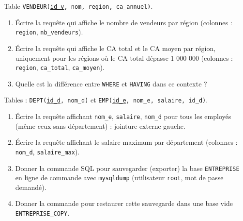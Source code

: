 \documentclass[11pt]{article}
\begin{document}
\begin{exercice}
Table \texttt{VENDEUR(\underline{id\_v}, nom, region, ca\_annuel)}.
\begin{enumerate}
    \item Écrire la requête qui affiche le nombre de vendeurs par région (colonnes : \texttt{region}, \texttt{nb\_vendeurs}).
    \item Écrire la requête qui affiche le CA total et le CA moyen par région, uniquement pour les régions où le CA total dépasse 1 000 000 (colonnes : \texttt{region}, \texttt{ca\_total}, \texttt{ca\_moyen}).
    \item Quelle est la différence entre \texttt{WHERE} et \texttt{HAVING} dans ce contexte ?
\end{enumerate}
\end{exercice}

\begin{exercice}
Tables : \texttt{DEPT(\underline{id\_d}, nom\_d)} et \texttt{EMP(\underline{id\_e}, nom\_e, salaire, id\_d)}.
\begin{enumerate}
    \item Écrire la requête affichant \texttt{nom\_e}, \texttt{salaire}, \texttt{nom\_d} pour tous les employés (même ceux sans département) : jointure externe gauche.
    \item Écrire la requête affichant le salaire maximum par département (colonnes : \texttt{nom\_d}, \texttt{salaire\_max}).
    \item Donner la commande SQL pour sauvegarder (exporter) la base \texttt{ENTREPRISE} en ligne de commande avec \texttt{mysqldump} (utilisateur \texttt{root}, mot de passe demandé).
    \item Donner la commande pour restaurer cette sauvegarde dans une base vide \texttt{ENTREPRISE\_COPY}.
\end{enumerate}
\end{exercice}
\end{document}
